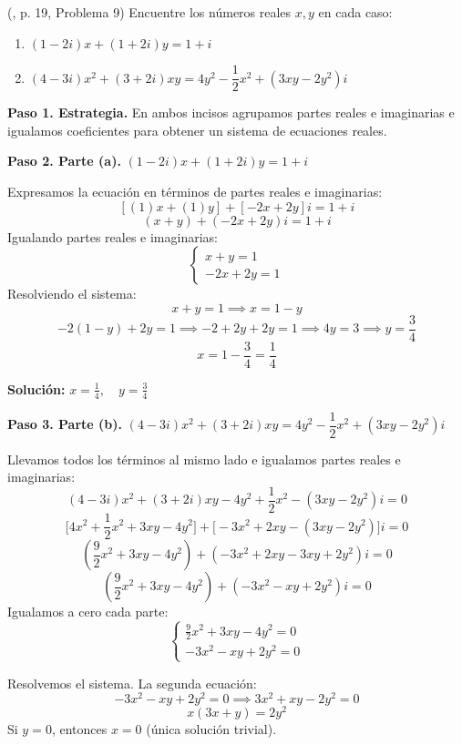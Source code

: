 \begin{prob} (\cite{andreescu2014complex}, p. 19, Problema 9) Encuentre los números reales $x, y$ en cada caso:
\begin{enumerate}[$a)$]
\item $(1-2i)x + (1+2i)y=1+i$
\item $(4-3i)x^2+(3+2i)xy=4y^2-\dfrac{1}{2}x^2+(3xy-2y^2)i$
\end{enumerate}
\begin{myproof}
\textbf{Paso 1. Estrategia.} En ambos incisos agrupamos partes reales e imaginarias e igualamos coeficientes para obtener un sistema de ecuaciones reales.

\textbf{Paso 2. Parte (a).} \quad $(1-2i)x + (1+2i)y = 1 + i$

Expresamos la ecuación en términos de partes reales e imaginarias:
\[
[(1)x + (1)y] + [-2x + 2y]i = 1 + i
\]
\[
(x + y) + (-2x + 2y)i = 1 + i
\]
Igualando partes reales e imaginarias:
\[
\begin{cases}
x + y = 1 \\
-2x + 2y = 1
\end{cases}
\]
Resolviendo el sistema:
\[
x + y = 1 \implies x = 1 - y
\]
\[
-2(1 - y) + 2y = 1 \implies -2 + 2y + 2y = 1 \implies 4y = 3 \implies y = \frac{3}{4}
\]
\[
x = 1 - \frac{3}{4} = \frac{1}{4}
\]

\textbf{Solución:} $\boxed{x = \frac{1}{4},\quad y = \frac{3}{4}}$

\vspace{1em}

\textbf{Paso 3. Parte (b).} \quad $(4-3i)x^2 + (3+2i)xy = 4y^2 - \dfrac{1}{2}x^2 + (3xy - 2y^2)i$

Llevamos todos los términos al mismo lado e igualamos partes reales e imaginarias:
\[
(4-3i)x^2 + (3+2i)xy - 4y^2 + \frac{1}{2}x^2 - (3xy-2y^2)i = 0
\]
\[
\bigg[4x^2 + \frac{1}{2}x^2 + 3xy - 4y^2\bigg] + \bigg[-3x^2 + 2xy - (3xy - 2y^2)\bigg]i = 0
\]
\[
\left(\frac{9}{2}x^2 + 3xy - 4y^2\right) + \left(-3x^2 + 2xy - 3xy + 2y^2\right)i = 0
\]
\[
\left(\frac{9}{2}x^2 + 3xy - 4y^2\right) + \left(-3x^2 - xy + 2y^2\right)i = 0
\]
Igualamos a cero cada parte:
\[
\begin{cases}
\frac{9}{2}x^2 + 3xy - 4y^2 = 0 \\
-3x^2 - xy + 2y^2 = 0
\end{cases}
\]

Resolvemos el sistema. La segunda ecuación:
\[
-3x^2 - xy + 2y^2 = 0 \implies 3x^2 + xy - 2y^2 = 0
\]
\[
x(3x + y) = 2y^2
\]
Si $y = 0$, entonces $x = 0$ (única solución trivial).


\end{myproof}
\end{prob}
